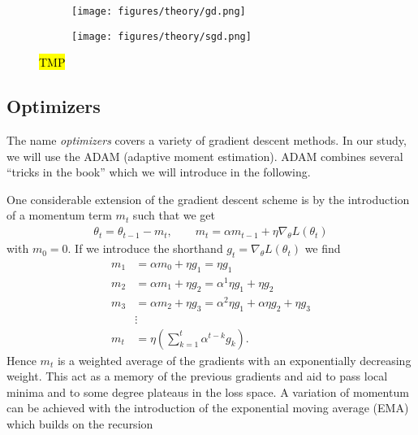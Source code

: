\begin{figure}[H]
  \centering
  \begin{subfigure}[t]{0.49\textwidth}
    \centering
    \texttt{[image: figures/theory/gd.png]}
    \caption{}
    \label{fig:gd}
  \end{subfigure}
  \hfill
  \begin{subfigure}[t]{0.49\textwidth}
    \centering
    \texttt{[image: figures/theory/sgd.png]}
    \caption{}
    \label{fig:sgd}
  \end{subfigure}
  \hfill
  \caption{\hl{TMP}}
  \label{fig:gradient_descent}
\end{figure}



\subsection{Optimizers}

The name \textit{optimizers} covers a variety of gradient descent methods. In our study, we will use the ADAM (adaptive moment estimation). ADAM combines several ``tricks in the book'' which we will introduce in the following.

One considerable extension of the gradient descent scheme is by the introduction of a momentum term $m_t$ such that we get
\begin{align}
  \theta_t = \theta_{t-1} - m_t, \qquad m_t = \alpha m_{t-1} + \eta \nabla_\theta L(\theta_t)
  \label{eq:mom}
\end{align}
with $m_0 = 0$. If we introduce the shorthand $g_t = \nabla_\theta L(\theta_t)$ we find
\begin{align}
  m_1 &= \alpha m_0 + \eta g_1 = \eta g_1 \nonumber \\
  m_2 &= \alpha m_1 + \eta g_2 = \alpha^1 \eta g_1 + \eta g_2 \nonumber \\
  m_3 &= \alpha m_2 + \eta g_3 = \alpha^2 \eta g_1 + \alpha\eta g_2 + \eta g_3 \nonumber \\
  &\vdots \nonumber \\
  m_t &= \eta \left(\sum_{k=1}^{t} \alpha^{t-k}g_k\right).
  \label{eq:mom_rec}
\end{align}
Hence $m_t$ is a weighted average of the gradients with an exponentially decreasing weight. This act as a memory of the previous gradients and aid to pass local minima and to some degree plateaus in the loss space. A variation of momentum can be achieved with the introduction of the exponential moving average (EMA) which builds on the recursion

